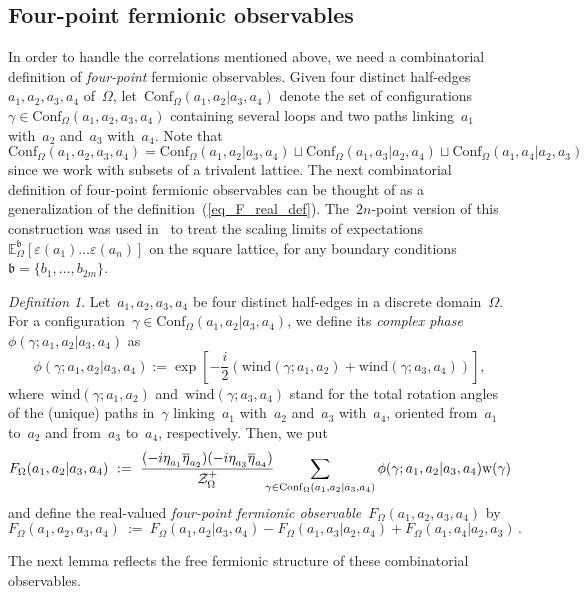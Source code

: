 \documentclass[reqno,11pt,a4paper]{amsart}
\theoremstyle{remark}
\newtheorem{definition}[proposition]{Definition}
\renewcommand{\b}{\mathfrak{b}}
\newcommand{\E}{\mathbb{E}_\Omega}
\newcommand{\wind}{\mathrm{wind}}
\newcommand{\phase}{\phi}
\newcommand{\weight}{\mathrm{w}}
\newcommand{\F}{F_\Omega}       \newcommand{\Fdelta}{F_{\Omega_\delta}}
\newcommand{\conf}{\mathrm{Conf}}
\newcommand\ConfO[1]{\conf_\Omega(#1)}
\def\cZ{\mathcal Z}
\begin{document}
\subsection{Four-point fermionic observables} In order to handle the correlations mentioned above, we need a combinatorial definition of \emph{four-point} fermionic observables. Given four distinct half-edges~$a_1,a_2,a_3,a_4$ of~$\Omega$, let~$\ConfO{a_1,a_2|a_3,a_4}$ denote the set of configurations~$\gamma\in\ConfO{a_1,a_2,a_3,a_4}$ containing several loops and two paths linking~$a_1$ with~$a_2$ and~$a_3$ with~$a_4$. Note that
\[
\ConfO{a_1,a_2,a_3,a_4}=\ConfO{a_1,a_2|a_3,a_4}\sqcup \ConfO{a_1,a_3|a_2,a_4}\sqcup \ConfO{a_1,a_4|a_2,a_3}
\]
since we work with subsets of a trivalent lattice. The next combinatorial definition of four-point fermionic observables can be thought of as a generalization of the definition~(\ref{eq_F_real_def}). The~$2n$-point version of this construction was used in~\cite{Hon10} to treat the scaling limits of expectations~$\E^\b[\varepsilon(a_1)\dots\varepsilon(a_n)]$ on the square lattice, for any boundary conditions~$\b=\{b_1,\dots,b_{2m}\}$.

\begin{definition}
\label{def_fermion_4pt}
Let~$a_1,a_2,a_3,a_4$ be four distinct half-edges in a discrete domain~$\Omega$. For a configuration~$\gamma\in\ConfO{a_1,a_2|a_3,a_4}$, we define its \emph{complex phase}~$\phase(\gamma;a_1,a_2|a_3,a_4)$ as
\[
\phase(\gamma;a_1,a_2|a_3,a_4) := \exp \left[ -{\textstyle\frac{i}{2}}(\wind(\gamma;a_1,a_2)+\wind(\gamma;a_3,a_4))\right],
\]
where~$\wind(\gamma;a_1,a_2)$ and~$\wind(\gamma;a_3,a_4)$ stand for the total rotation angles of the (unique) paths in~$\gamma$ linking~$a_1$ with~$a_2$ and~$a_3$ with~$a_4$, oriented from~$a_1$ to~$a_2$ and from~$a_3$ to~$a_4$, respectively. Then, we put
\[
\F(a_1,a_2|a_3,a_4)~:=~\frac{(-i\eta_{a_1}^{\vphantom{1}}\overline{\eta}_{a_2})(-i\eta_{a_3}^{\vphantom{1}}\overline{\eta}_{a_4})} {\cZ_\Omega^+}\!\!\!\!\! \sum_{\gamma\in\ConfO{a_1,a_2|a_3,a_4}} {\phase(\gamma;a_1,a_2|a_3,a_4)\weight(\gamma)}
\]
and define the real-valued \emph{four-point fermionic observable}~$\F(a_1,a_2,a_3,a_4)$ by
\[%
\F(a_1,a_2,a_3,a_4)~:=~ \F(a_1,a_2|a_3,a_4)-\F(a_1,a_3|a_2,a_4)+\F(a_1,a_4|a_2,a_3)\,.
\]
\end{definition}

The next lemma reflects the free fermionic structure of these combinatorial observables.
\end{document}
